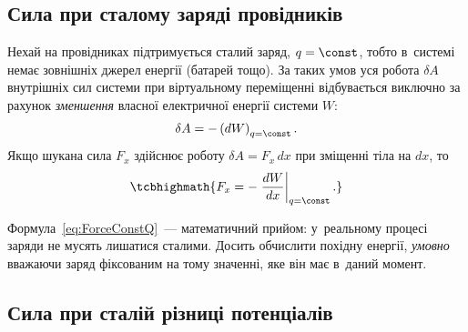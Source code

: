 \subsection*{Сила при сталому заряді провідників}



Нехай на провідниках підтримується сталий заряд, $q = \const$, тобто в~системі немає
зовнішніх джерел енергії (батарей тощо). За таких умов уся робота $\delta A$ внутрішніх
сил системи при віртуальному переміщенні відбувається виключно за рахунок
\emph{зменшення} власної електричної енергії системи $W$:
\begin{equation*}
	\delta A = -\left(dW\right)_{q=\const}.
\end{equation*}
Якщо шукана сила $F_x$ здійснює роботу $\delta A = F_x\, dx$ при зміщенні тіла на $dx$, то
\begin{equation}\label{eq:ForceConstQ}
	\tcbhighmath{
		F_x = -\left.\frac{dW}{dx}\right|_{q=\const}.
	}
\end{equation}

\begin{Attention}
	Формула~\eqref{eq:ForceConstQ}~--- математичний прийом: у~реальному процесі заряди не
	мусять лишатися сталими. Досить обчислити похідну енергії, \emph{умовно} вважаючи заряд
	фіксованим на тому значенні, яке він має в~даний момент.
\end{Attention}



\subsection*{Сила при сталій різниці потенціалів}



